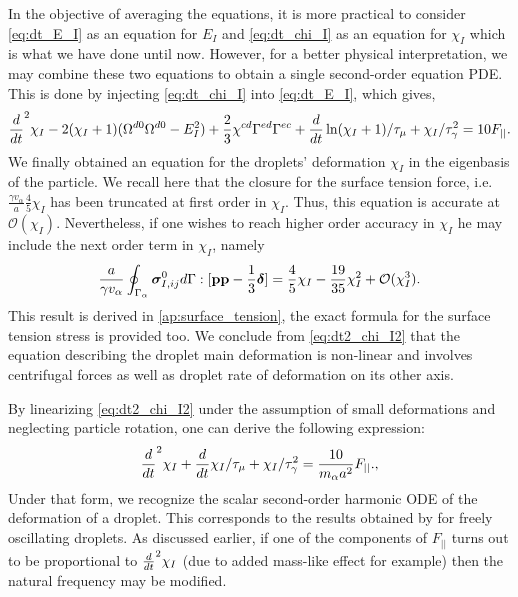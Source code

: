 In the objective of averaging the equations, it is more practical to consider \ref{eq:dt_E_I} as an equation for $E_I$ and \ref{eq:dt_chi_I} as an equation for $\chi_I$ which is what we have done until now. 
However, for a better physical interpretation, we may combine these two equations to obtain a single second-order equation PDE. 
This is done by injecting \ref{eq:dt_chi_I} into \ref{eq:dt_E_I}, which gives, 
\begin{equation}
        \ddt^2 \chi_I
        - 2(\chi_I+1)( \Omega^{d0} \Omega^{d0}  - E_I^2) 
        + \frac{2}{3} \chi^{cd}
        \Gamma^{ed}\Gamma^{ec}
    + \ddt \ln(\chi_I+1) /\tau_\mu
    + \chi_I/\tau_\gamma^2
    = 10 F_{||}. 
    \label{eq:dt2_chi_I2}
\end{equation} 
We finally obtained an equation for the droplets' deformation $\chi_I$ in the eigenbasis of the particle.
We recall here that the closure for the surface tension force, i.e. $\frac{\gamma v_\alpha }{a} \frac{4  }{5} \chi_I$ has been truncated at first order in $\chi_I$.
Thus, this equation is accurate at $\mathcal{O}(\chi_I)$.
Nevertheless, if one wishes to reach higher order accuracy in $\chi_I$ he may include the next order term in $\chi_I$, namely 
\begin{equation*}
    \frac{a}{\gamma v_\alpha}\oint_{\Gamma_{\alpha}} \bm\sigma_{I,ij}^0 d\Gamma : [\textbf{pp} - \frac{1}{3} \bm\delta]
    = \frac{4}{5} \chi_I - \frac{19}{35}\chi_I^2 + \mathcal{O}(\chi_I^3). 
\end{equation*}
This result is derived in \ref{ap:surface_tension}, the exact formula for the surface tension stress is provided too.  
We conclude from \ref{eq:dt2_chi_I2} that the equation describing the droplet main deformation is non-linear and involves centrifugal forces as well as droplet rate of deformation on its other axis. 


By linearizing \ref{eq:dt2_chi_I2} under the assumption of small deformations and neglecting particle rotation, one can derive the following expression:
\begin{equation}
    \ddt^2 \chi_I
    + \ddt \chi_I/\tau_\mu
    + 
     \chi_I /\tau_\gamma^2
    = \frac{10}{m_\alpha a^2}F_{||}. ,
    \label{eq:lamb_like_model}
\end{equation} 
Under that form, we recognize the scalar second-order harmonic ODE of the deformation of a droplet.
This corresponds to the results obtained by  \citet{lamb1924hydrodynamics} for freely oscillating droplets. 
As discussed earlier, if one of the components of $F_{||}$ turns out to be proportional to $\frac{d}{dt}^2 \chi_I$ (due to added mass-like effect for example) then the natural frequency may be modified. 


